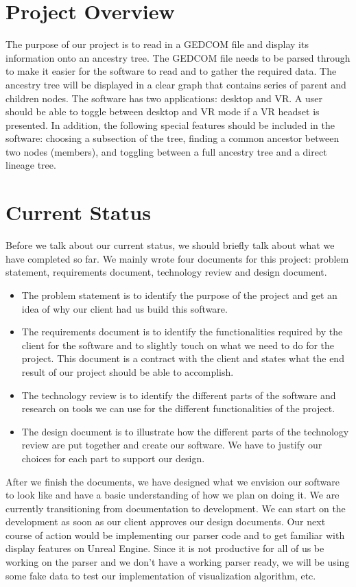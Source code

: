 \documentclass[onecolumn, draftclsnofoot, 10pt, compsoc]{IEEEtran}
\begin{document}
\section{Project Overview }
\begin{singlespace}
The purpose of our project is to read in a GEDCOM file and display its information onto an ancestry tree. The GEDCOM file needs to be parsed through to make it easier for the software to read and to gather the required data. The ancestry tree will be displayed in a clear graph that contains series of parent and children nodes. The software has two applications: desktop and VR. A user should be able to toggle between desktop and VR mode if a VR headset is presented. In addition, the following special features should be included in the software: choosing a subsection of the tree, finding a common ancestor between two nodes (members), and toggling between a full ancestry tree and a direct lineage tree.
\end{singlespace}

\section{Current Status}
\begin{singlespace}
Before we talk about our current status, we should briefly talk about what we have completed so far. We mainly wrote four documents for this project: problem statement, requirements document, technology review and design document.
\begin{itemize}
\item The problem statement is to identify the purpose of the project and get an idea of why our client had us build this software.
\item The requirements document is to identify the functionalities required by the client for the software and to slightly touch on what we need to do for the project. This document is a contract with the client and states what the end result of our project should be able to accomplish. 
\item The technology review is to identify the different parts of the software and research on tools we can use for the different functionalities of the project.
\item The design document is to illustrate how the different parts of the technology review are put together and create our software. We have to justify our choices for each part to support our design. 
\end{itemize}
 

After we finish the documents, we have designed what we envision our software to look like and have a basic understanding of how we plan on doing it. We are currently transitioning from documentation to development. We can start on the development as soon as our client approves our design documents. Our next course of action would be implementing our parser code and to get familiar with display features on Unreal Engine. Since it is not productive for all of us be working on the parser and we don't have a working parser ready, we will be using some fake data to test our implementation of visualization algorithm, etc.
\end{singlespace}
\end{document}
